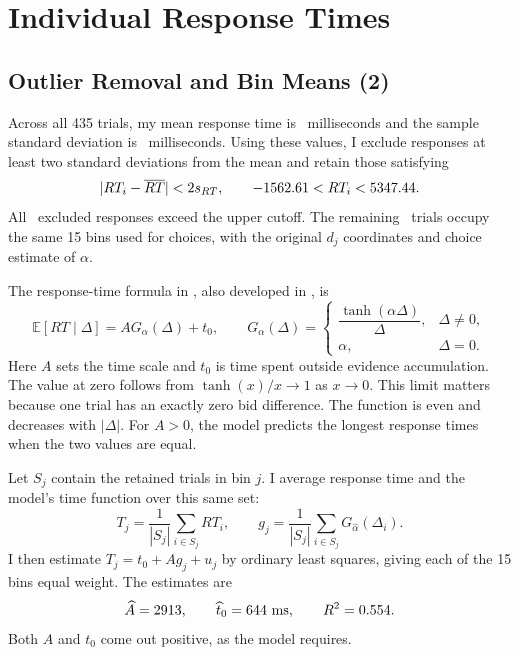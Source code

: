 \section{Individual Response Times}
\label{sec:individual-times}

\subsection{Outlier Removal and Bin Means (2)}
Across all 435 trials, my mean response time is \RTMean\ milliseconds and
the sample standard deviation is \RTSD\ milliseconds. Using these
values, I exclude responses at least two standard deviations from the mean
and retain those satisfying
\[
  |RT_i-\overline{RT}|<2s_{RT},
  \qquad
  -1562.61<RT_i<5347.44.
\]
All \RTRemoved\ excluded responses exceed the upper cutoff. The remaining
\RTKept\ trials occupy the same 15 bins used for choices, with the original
$d_j$ coordinates and choice estimate of $\alpha$.

The response-time formula in \textcite[slide 10]{woodford2026ddm}, also
developed in \textcite[pp.\ 3--4]{souther2026ddm}, is
\begin{equation}\label{eq:mean-time}
  \mathbb{E}[RT\mid\Delta]=A G_\alpha(\Delta)+t_0,
  \qquad
  G_\alpha(\Delta)=
  \begin{cases}
    \dfrac{\tanh(\alpha\Delta)}{\Delta}, & \Delta\ne0,\\[6pt]
    \alpha, & \Delta=0.
  \end{cases}
\end{equation}
Here $A$ sets the time scale and $t_0$ is time spent outside evidence
accumulation. The value at zero follows from $\tanh(x)/x\to1$ as $x\to0$.
This limit matters because one trial has an exactly zero bid difference.
The function is even and decreases with $|\Delta|$. For $A>0$, the model
predicts the longest response times when the two values are equal.

Let $S_j$ contain the retained trials in bin $j$. I average response time
and the model's time function over this same set:
\[
  T_j=\frac{1}{|S_j|}\sum_{i\in S_j}RT_i,
  \qquad
  g_j=\frac{1}{|S_j|}\sum_{i\in S_j}G_{\widehat\alpha}(\Delta_i).
\]
I then estimate $T_j=t_0+A g_j+u_j$ by ordinary least squares, giving each
of the 15 bins equal weight. The estimates are
\[
  \widehat A=2913,
  \qquad \widehat t_0=644\ \text{ms},
  \qquad R^2=0.554.
\]
Both $A$ and $t_0$ come out positive, as the model requires.

